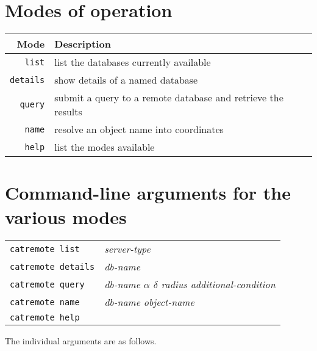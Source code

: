\documentclass[twoside,11pt]{starlink}
\begin{document}
\scfrontmatter

\section*{Modes of operation}

\begin{center}
\begin{tabular}{rl}
Mode          &  Description \\ \hline
\texttt{list}    & list the databases currently available \\
\texttt{details} & show details of a named database \\
\texttt{query}   & submit a query to a remote database and retrieve the results \\
\texttt{name}    & resolve an object name into coordinates \\
\texttt{help}    & list the modes available \\
\end{tabular}
\end{center}

\section*{Command-line arguments for the various modes}

\begin{center}
\begin{tabular}{ll}
\texttt{catremote list}    & \textit{server-type} \\
\texttt{catremote details} & \textit{db-name} \\
\texttt{catremote query}   & \textit{db-name $\alpha$ $\delta$ radius
    additional-condition} \\
\texttt{catremote name}    & \textit{db-name object-name} \\
\texttt{catremote help}    & \\
\end{tabular}
\end{center}

The individual arguments are as follows.
\end{document}
